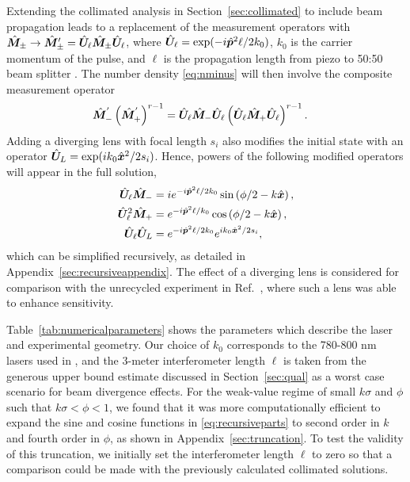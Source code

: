Extending the collimated analysis in Section~\ref{sec:collimated} to include beam propagation leads to a replacement of the measurement operators with $\hat{\bm M}_\pm \to \hat{\bm M}'_\pm = \hat{\bm U}_\ell \hat{\bm M}_\pm \hat{\bm U}_\ell$, where $\hat{\bm U}_\ell = \exp(-i \hat{\bm p}^2 \ell / 2 k_0)$, $k_0$ is the carrier momentum of the pulse, and $\ell$ is the propagation length from piezo to 50:50 beam splitter \cite{Born1959}.  The number density \eqref{eq:nminus} will then involve the composite measurement operator 
\begin{align}\label{eq:recursivetotal}
  \hat{\bm M}_-^{'}\left(\hat{\bm M}_+^{'}\right)^{r-1} &= \hat{\bm U}_\ell\hat{\bm M}_-\hat{\bm U}_\ell \left(\hat{\bm U}_\ell\hat{\bm M}_+\hat{\bm U}_\ell\right)^{r-1}.
\end{align}  
Adding a diverging lens with focal length $s_i$ also modifies the initial state with an operator $\hat{\bm U}_L = \exp(i k_0 \hat{\bm x}^2 / 2 s_i)$.  Hence, powers of the following modified operators will appear in the full solution,
\begin{subequations}\label{eq:recursiveparts}
\begin{align}
  \hat{\bm U}_\ell\hat{\bm M}_- &= i e^{-i\hat{\bm p}^2\ell/2k_0}\sin\left(\phi/2 - k\hat{\bm x}\right) , \\
  \hat{\bm U}_\ell^2 \hat{\bm M}_+ &= e^{-i\hat{\bm p}^2\ell/k_0}\cos\left(\phi/2 - k\hat{\bm x}\right) , \\
  \hat{\bm U}_\ell\hat{\bm U}_L &= e^{-i\hat{\bm p}^2\ell/2k_0}e^{ik_0\hat{\bm x}^2/2s_i},
\end{align}
\end{subequations}
which can be simplified recursively, as detailed in Appendix~\ref{sec:recursiveappendix}.  The effect of a diverging lens is considered for comparison with the unrecycled experiment in Ref.~\cite{Dixon2009}, where such a lens was able to enhance sensitivity.  

Table~\ref{tab:numericalparameters} shows the parameters which describe the laser and experimental geometry. Our choice of $k_0$ corresponds to the 780-800 nm lasers used in \cite{Dixon2009,Starling2009,Starling2010a,Starling2010b}, and the 3-meter interferometer length $\ell$ is taken from the generous upper bound estimate discussed in Section~\ref{sec:qual} as a worst case scenario for beam divergence effects.  For the weak-value regime of small $k\sigma$ and $\phi$ such that $k\sigma < \phi < 1$, we found that it was more computationally efficient to expand the sine and cosine functions in \eqref{eq:recursiveparts} to second order in $k$ and fourth order in $\phi$, as shown in Appendix~\ref{sec:truncation}.  To test the validity of this truncation, we initially set the interferometer length $\ell$ to zero so that a comparison could be made with the previously calculated collimated solutions.

